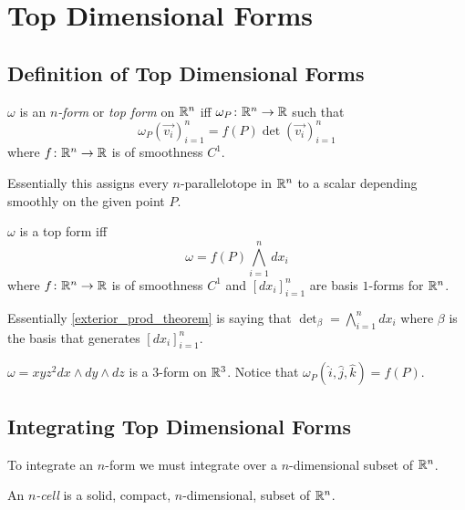 \documentclass[notes.tex]{subfiles}
\begin{document}
\setcounter{section}{5}
\section{Top Dimensional Forms}
\subsection{Definition of Top Dimensional Forms}

\begin{definition}
    $\omega$ is an \textit{$n$-form} or \textit{top form} on $\mathbb{R}^n$ iff %
    $\omega_P\colon \mathbb{R}^n \to \mathbb{R}$ such that
    \[
        \omega_P(\vec{v_i})_{i = 1}^n = f(P)\det(\vec{v_i})_{i = 1}^n
    \]
    where $f\colon \mathbb{R}^n \to \mathbb{R}$ is of smoothness $C^1$.
\end{definition}

Essentially this assigns every $n$-parallelotope in $\mathbb{R}^n$ to a scalar depending smoothly on the given point $P$.

\begin{lemma} \label{exterior_prod_theorem}
    $\omega$ is a top form iff
    \[
        \omega = f(P) \bigwedge_{i = 1}^n dx_i
    \]
    where $f\colon \mathbb{R}^n \to \mathbb{R}$ is of smoothness $C^1$ and $[dx_i]_{i = 1}^n$ are basis $1$-forms for $\mathbb{R}^n$.
\end{lemma}

Essentially \cref{exterior_prod_theorem} is saying that $\det_\beta = \bigwedge_{i = 1}^n dx_i$ where $\beta$ is the basis that generates $[dx_i]_{i = 1}^n$.

\begin{example}
    $\omega = xyz^2 dx \wedge dy \wedge dz$ is a $3$-form on $\mathbb{R}^3$. Notice that $\omega_P(\hat{i}, \hat{j}, \hat{k}) = f(P)$.
\end{example}

\subsection{Integrating Top Dimensional Forms}
To integrate an $n$-form we must integrate over a $n$-dimensional subset of $\mathbb{R}^n$.

\begin{definition}[$n$-Cell]
    An \textit{$n$-cell} is a solid, compact, $n$-dimensional, subset of $\mathbb{R}^n$.
\end{definition}
\end{document}

